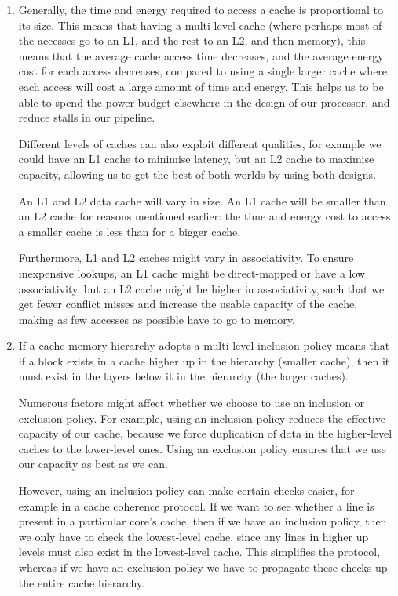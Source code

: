 


\begin{enumerate}[label=(\alph*)]

  \item

    Generally, the time and energy required to access a cache is proportional to its size. This means that having a multi-level cache (where perhaps most of the accesses go to an L1, and the rest to an L2, and then memory), this means that the average cache access time decreases, and the average energy cost for each access decreases, compared to using a single larger cache where each access will cost a large amount of time and energy. This helps us to be able to spend the power budget elsewhere in the design of our processor, and reduce stalls in our pipeline.

    Different levels of caches can also exploit different qualities, for example we could have an L1 cache to minimise latency, but an L2 cache to maximise capacity, allowing us to get the best of both worlds by using both designs.

    An L1 and L2 data cache will vary in size. An L1 cache will be smaller than an L2 cache for reasons mentioned earlier: the time and energy cost to access a smaller cache is less than for a bigger cache.

    Furthermore, L1 and L2 caches might vary in associativity. To ensure inexpensive lookups, an L1 cache might be direct-mapped or have a low associativity, but an L2 cache might be higher in associativity, such that we get fewer conflict misses and increase the usable capacity of the cache, making as few accesses as possible have to go to memory.

  \item
    If a cache memory hierarchy adopts a multi-level inclusion policy means that if a block exists in a cache higher up in the hierarchy (smaller cache), then it must exist in the layers below it in the hierarchy (the larger caches).

    Numerous factors might affect whether we choose to use an inclusion or exclusion policy. For example, using an inclusion policy reduces the effective capacity of our cache, because we force duplication of data in the higher-level caches to the lower-level ones. Using an exclusion policy ensures that we use our capacity as best as we can.

    However, using an inclusion policy can make certain checks easier, for example in a cache coherence protocol. If we want to see whether a line is present in a particular core's cache, then if we have an inclusion policy, then we only have to check the lowest-level cache, since any lines in higher up levels must also exist in the lowest-level cache. This simplifies the protocol, whereas if we have an exclusion policy we have to propagate these checks up the entire cache hierarchy.


\end{enumerate}
